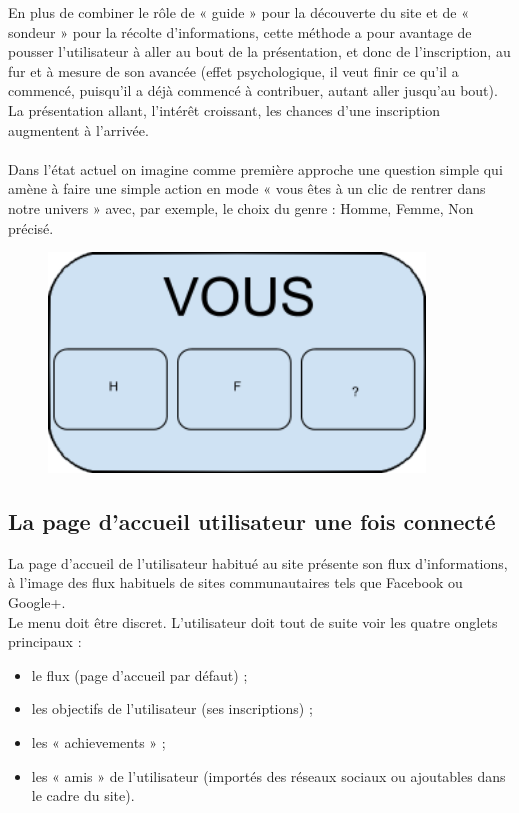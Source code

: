 \documentclass{life-fr}
\begin{document}
En plus de combiner le rôle de « guide » pour la découverte du site et de « sondeur » pour la récolte d'informations, cette méthode a pour avantage de pousser l'utilisateur à aller au bout de la présentation, et donc de l'inscription, au fur et à mesure de son avancée (effet psychologique, il veut finir ce qu'il a commencé, puisqu'il a déjà commencé à contribuer, autant aller jusqu'au bout). La présentation allant, l'intérêt croissant, les chances d'une inscription augmentent à l'arrivée.\\
\\

Dans l'état actuel on imagine comme première approche une question simple qui amène à faire une simple action en mode « vous êtes à un clic de rentrer dans notre univers » avec, par exemple, le choix du genre : Homme, Femme, Non précisé.

\begin{figure}[H]
  \begin{center}
    \includegraphics[width=10cm]{img/vous.png}
  \end{center}
\end{figure}

\newpage

\subsection{La page d'accueil utilisateur une fois connecté}

La page d'accueil de l'utilisateur habitué au site présente son flux d'informations, à l'image des flux habituels de sites communautaires tels que Facebook ou Google+. \\

Le menu doit être discret. L'utilisateur doit tout de suite voir les quatre onglets principaux :

\begin{itemize}
  \item le flux (page d'accueil par défaut) ;
  \item les objectifs de l'utilisateur (ses inscriptions) ;
  \item les « achievements » ;
  \item les « amis » de l'utilisateur (importés des réseaux sociaux ou ajoutables dans le cadre du site).
\end{itemize}
\end{document}

